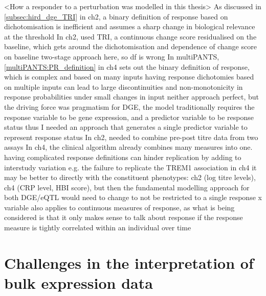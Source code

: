 \begin{outline}
\1 <How a responder to a perturbation was modelled in this thesis>
    \2 As discussed in \autoref{subsec:hird_dge_TRI} in ch2, a binary definition of response based on dichotomisation is inefficient and assumes a sharp change in biological relevance at the threshold
    \2 In ch2, used \gls{TRI}, a continuous change score residualised on the baseline, which gets around the dichotomisation and dependence of change score on baseline
        \3 two-stage approach here, so df is wrong
    \2 In multiPANTS, \autoref{multiPANTS:PR_definition} in ch4 sets out the binary definition of response, which is complex and based on many inputs
        \3 having response dichotomies based on multiple inputs can lead to large discontinuities and non-monotonicity in response probabilities under small changes in input \autocite{senn2005DichotomaniaObsessiveCompulsive} 
    \2 neither approach perfect, but the driving force was pragmatism
        \3 for DGE, the model traditionally requires the response variable to be gene expression, and a predictor variable to be response status
        \3 thus I needed an approach that generates a single predictor variable to represent response status
        \3 In ch2, needed to combine pre-post titre data from two assays
        \3 In ch4, the clinical algorithm already combines many measures into one.
    \2 having complicated response definitions can hinder replication by adding to interstudy variation e.g. the failure to replicate the TREM1 association in ch4
    \2 it may be better to directly with the constituent phenotypes: ch2 (log titre levels), ch4 (CRP level, HBI score), but then the fundamental modelling approach for both DGE/eQTL would need to change to not be restricted to a single response x variable 
    \2 also applies to continuous measures of response, as what is being considered is that it only makes sense to talk about response if the response measure is tightly correlated within an individual over time


\section{Challenges in the interpretation of bulk expression data}


\end{outline}
